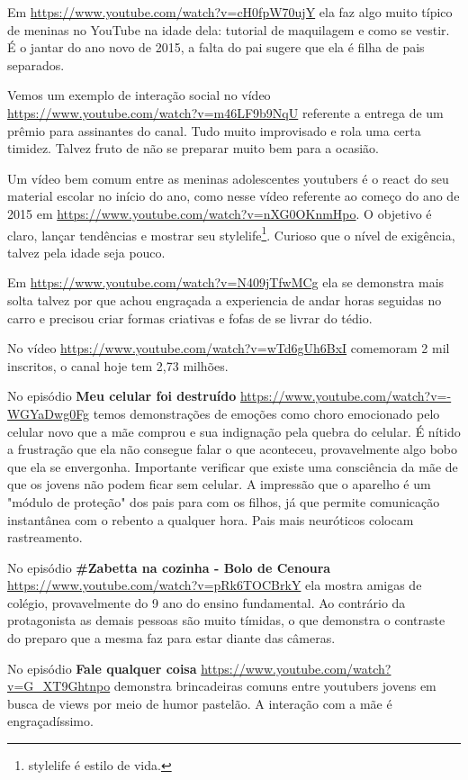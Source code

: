 Em \url{https://www.youtube.com/watch?v=cH0fpW70ujY} ela faz algo muito típico de meninas no YouTube na idade dela: tutorial de maquilagem e como se vestir. É o jantar do ano novo de 2015, a falta do pai sugere que ela é filha de pais separados.

Vemos um exemplo de interação social no vídeo \url{https://www.youtube.com/watch?v=m46LF9b9NqU} referente a entrega de um prêmio para assinantes do canal. Tudo muito improvisado e rola uma certa timidez. Talvez fruto de não se preparar muito bem para a ocasião.

Um vídeo bem comum entre as meninas adolescentes youtubers é o react do seu material escolar no início do ano, como nesse vídeo referente ao começo do ano de 2015 em \url{https://www.youtube.com/watch?v=nXG0OKnmHpo}. O objetivo é claro, lançar tendências e mostrar seu stylelife\footnote{stylelife é estilo de vida.}. Curioso que o nível de exigência, talvez pela idade seja pouco.

Em \url{https://www.youtube.com/watch?v=N409jTfwMCg} ela se demonstra mais solta talvez por que achou engraçada a experiencia de andar horas seguidas no carro e precisou criar formas criativas e fofas de se livrar do tédio.

No vídeo \url{https://www.youtube.com/watch?v=wTd6gUh6BxI} comemoram 2 mil inscritos, o canal hoje tem 2,73 milhões.

No episódio \textbf{Meu celular foi destruído} \url{https://www.youtube.com/watch?v=-WGYaDwg0Fg} temos demonstrações de emoções como choro emocionado pelo celular novo que a mãe comprou e sua indignação pela quebra do celular. É nítido a frustração que ela não consegue falar o que aconteceu, provavelmente algo bobo que ela se envergonha. Importante verificar que existe uma consciência da mãe de que os jovens não podem ficar sem celular. A impressão que o aparelho é um "módulo de proteção" dos pais para com os filhos, já que permite comunicação instantânea com o rebento a qualquer hora. Pais mais neuróticos colocam rastreamento.

No episódio \textbf{\#Zabetta na cozinha - Bolo de Cenoura} \url{https://www.youtube.com/watch?v=pRk6TOCBrkY} ela mostra amigas de colégio, provavelmente do 9 ano do ensino fundamental. Ao contrário da protagonista as demais pessoas são muito tímidas, o que demonstra o contraste do preparo que a mesma faz para estar diante das câmeras.

No episódio \textbf{Fale qualquer coisa} \url{https://www.youtube.com/watch?v=G_XT9Ghtnpo} demonstra brincadeiras comuns entre youtubers jovens em busca de views por meio de humor pastelão. A interação com a mãe é engraçadíssimo.

